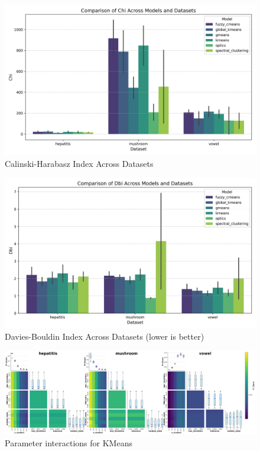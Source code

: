 \begin{figure}[ht!]
    \centering
    \includegraphics[width=\textwidth]{figures/model_comparison_chi.png}
    \caption{Calinski-Harabasz Index Across Datasets}
    \label{fig:model_comparison_chi_full}
\end{figure}

\begin{figure}[htb!]
    \centering
    \includegraphics[width=\textwidth]{figures/model_comparison_dbi.png}
    \caption{Davies-Bouldin Index Across Datasets (lower is better)}
    \label{fig:model_comparison_dbi_full}
\end{figure}
\clearpage

\begin{figure}[!htbp]
    \includegraphics[width=\textwidth]{figures/interactions_kmeans.png}
    \caption{Parameter interactions for KMeans}
    \label{fig:interactions_kmeans_full}
\end{figure}


\FloatBarrier

